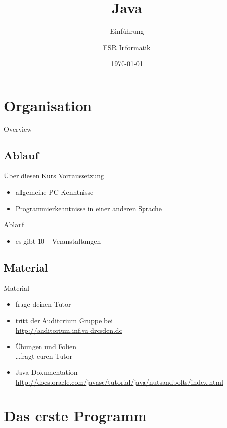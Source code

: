 

\title{Java}
\subtitle{Einführung}
\author{FSR Informatik}
\date{\today}



\section{Organisation}
\begin{frame}
	\titlepage
\end{frame}
\begin{frame}{Overview}
	\tableofcontents
\end{frame}

\subsection{Ablauf}
\begin{frame}{Über diesen Kurs}
	Vorraussetzung
	\begin{itemize}
		\item allgemeine PC Kenntnisse
		\item Programmierkenntnisse in einer anderen Sprache
	\end{itemize}
	Ablauf
	\begin{itemize}
		\item es gibt 10+ Veranstaltungen
	\end{itemize}
\end{frame}

\subsection{Material}
\begin{frame}{Material}
	\begin{itemize}
		\item frage deinen Tutor
		\item tritt der Auditorium Gruppe bei \hfill \\
			\url{http://auditorium.inf.tu-dresden.de}
		\item Übungen und Folien \hfill \\
			\dots fragt euren Tutor
		\item Java Dokumentation \hfill \\
			\url{http://docs.oracle.com/javase/tutorial/java/nutsandbolts/index.html}
	\end{itemize}
\end{frame}

\section{Das erste Programm}
